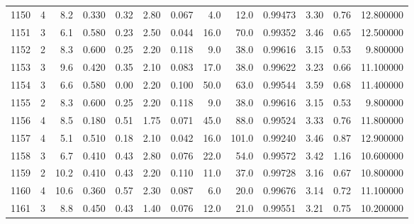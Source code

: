 \begin{tabular}{lrrrrrrrrrrrr}
1150 &        4 &            8.2 &             0.330 &         0.32 &            2.80 &      0.067 &                  4.0 &                  12.0 &  0.99473 &  3.30 &       0.76 &  12.800000 \\
1151 &        3 &            6.1 &             0.580 &         0.23 &            2.50 &      0.044 &                 16.0 &                  70.0 &  0.99352 &  3.46 &       0.65 &  12.500000 \\
1152 &        2 &            8.3 &             0.600 &         0.25 &            2.20 &      0.118 &                  9.0 &                  38.0 &  0.99616 &  3.15 &       0.53 &   9.800000 \\
1153 &        3 &            9.6 &             0.420 &         0.35 &            2.10 &      0.083 &                 17.0 &                  38.0 &  0.99622 &  3.23 &       0.66 &  11.100000 \\
1154 &        3 &            6.6 &             0.580 &         0.00 &            2.20 &      0.100 &                 50.0 &                  63.0 &  0.99544 &  3.59 &       0.68 &  11.400000 \\
1155 &        2 &            8.3 &             0.600 &         0.25 &            2.20 &      0.118 &                  9.0 &                  38.0 &  0.99616 &  3.15 &       0.53 &   9.800000 \\
1156 &        4 &            8.5 &             0.180 &         0.51 &            1.75 &      0.071 &                 45.0 &                  88.0 &  0.99524 &  3.33 &       0.76 &  11.800000 \\
1157 &        4 &            5.1 &             0.510 &         0.18 &            2.10 &      0.042 &                 16.0 &                 101.0 &  0.99240 &  3.46 &       0.87 &  12.900000 \\
1158 &        3 &            6.7 &             0.410 &         0.43 &            2.80 &      0.076 &                 22.0 &                  54.0 &  0.99572 &  3.42 &       1.16 &  10.600000 \\
1159 &        2 &           10.2 &             0.410 &         0.43 &            2.20 &      0.110 &                 11.0 &                  37.0 &  0.99728 &  3.16 &       0.67 &  10.800000 \\
1160 &        4 &           10.6 &             0.360 &         0.57 &            2.30 &      0.087 &                  6.0 &                  20.0 &  0.99676 &  3.14 &       0.72 &  11.100000 \\
1161 &        3 &            8.8 &             0.450 &         0.43 &            1.40 &      0.076 &                 12.0 &                  21.0 &  0.99551 &  3.21 &       0.75 &  10.200000 \\

\end{tabular}
